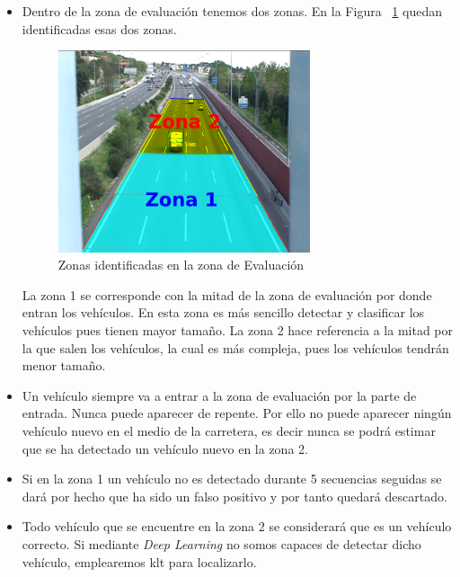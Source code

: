 \begin{itemize}
    \item Dentro de la zona de evaluación tenemos dos zonas. En la
     Figura ~\ref{fig.zona_evaluacion} quedan identificadas esas dos zonas.
    \begin{figure}[H] 
\begin{center}
	\includegraphics[width=0.7\textwidth]{figures/Diseno_global/zonas_evaluacion.png}
   \caption{Zonas identificadas en la zona de Evaluación}
	\label{fig.zona_evaluacion}
\end{center}

\end{figure}
    La zona 1 se corresponde con la mitad de la zona de evaluación por donde entran los vehículos. En esta zona es más sencillo detectar y clasificar los vehículos pues tienen mayor tamaño. La zona 2 hace referencia a la mitad por la que salen los vehículos, la cual es más compleja, pues los vehículos tendrán menor tamaño.
    \item Un vehículo siempre va a entrar a la zona de evaluación por la parte de entrada. Nunca puede aparecer de repente. Por ello no puede aparecer ningún vehículo nuevo en el medio de la carretera, es decir nunca se podrá estimar que se ha detectado un vehículo nuevo en la zona 2.
    \item Si en la zona 1 un vehículo no es detectado durante 5 secuencias seguidas se dará por hecho que ha sido un falso positivo y por tanto quedará descartado.
    \item Todo vehículo que se encuentre en la zona 2 se considerará que es un vehículo correcto. Si mediante \textit{Deep Learning} no somos capaces de detectar dicho vehículo, emplearemos \acrshort{klt} para localizarlo. 
\end{itemize}

